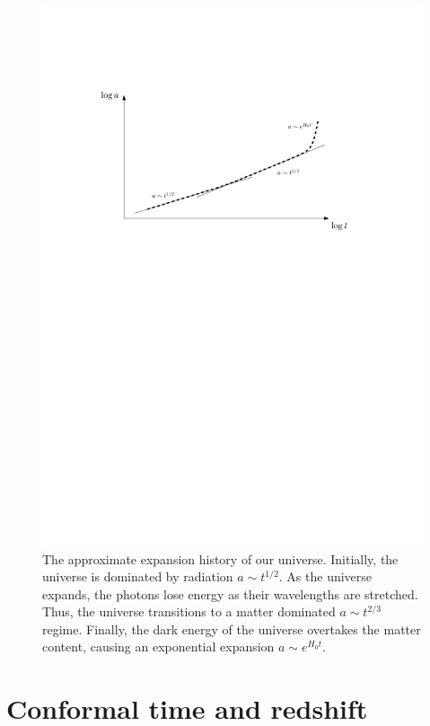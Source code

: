 \begin{figure}[tp]
  \centering
  \includegraphics[width=\textwidth]{chapters/inflationary_cosmology/figures/expansion_history}
  \caption{The approximate expansion history of our universe. Initially, the universe is dominated by radiation \(a\sim t^{1/2}\). As the universe expands, the photons lose energy as their wavelengths are stretched.  Thus, the universe transitions to a matter dominated \(a\sim t^{2/3}\) regime. Finally, the dark energy of the universe overtakes the matter content, causing an exponential expansion \(a\sim e^{H_0 t}\).}\label{fig:cos:expansion_history}
\end{figure}


\section{Conformal time and redshift}

